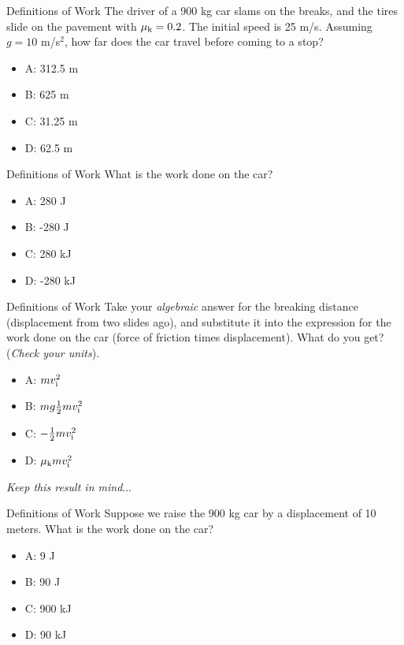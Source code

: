 \documentclass{beamer}
\begin{document}
\begin{frame}{Definitions of Work}
The driver of a 900 kg car slams on the breaks, and the tires slide on the pavement with $\mu_{\rm k} = 0.2$.  The initial speed is 25 m/s.  Assuming $g = 10$ m/s$^2$, how far does the car travel before coming to a stop?
\begin{itemize}
\item A: 312.5 m
\item B: 625 m
\item C: 31.25 m
\item D: 62.5 m
\end{itemize}
\end{frame}

\begin{frame}{Definitions of Work}
What is the work done on the car?
\begin{itemize}
\item A: 280 J
\item B: -280 J
\item C: 280 kJ
\item D: -280 kJ
\end{itemize}
\end{frame}

\begin{frame}{Definitions of Work}
Take your \textit{algebraic} answer for the breaking distance (displacement from two slides ago), and substitute it into the expression for the work done on the car (force of friction times displacement).  What do you get?  (\textit{Check your units}).
\begin{itemize}
\item A: $m v_{\rm i}^2$
\item B: $m g \frac{1}{2} m v_{\rm i}^2$
\item C: $-\frac{1}{2} m v_{\rm i}^2$
\item D: $\mu_{\rm k} m v_{\rm i}^2$
\end{itemize}
\textit{Keep this result in mind}...
\end{frame}

\begin{frame}{Definitions of Work}
Suppose we raise the 900 kg car by a displacement of 10 meters.  What is the work done on the car?
\begin{itemize}
\item A: 9 J
\item B: 90 J
\item C: 900 kJ
\item D: 90 kJ
\end{itemize}
\end{frame}
\end{document}
